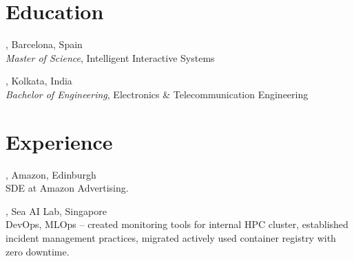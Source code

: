 \documentclass[mm]{simple_style}
\begin{document}
\address{Kolkata, India}


\begin{resume}

\section{Education}
, Barcelona, Spain \\
{\it Master of Science}, Intelligent Interactive Systems\\

\vspace{-4ex}

, Kolkata, India \\
{\it Bachelor of Engineering}, Electronics \& Telecommunication Engineering\\
\sectionline



\section{Experience}

, Amazon, Edinburgh  \\
SDE at Amazon Advertising.\\

\vspace{-4.5ex}

, Sea AI Lab, Singapore \\
DevOps, MLOps -- created monitoring tools for internal HPC cluster, established incident management practices, migrated actively used container registry with zero downtime.\\


\end{resume}
\end{document}
